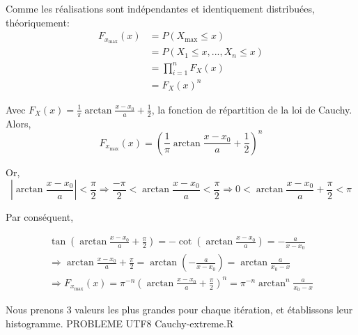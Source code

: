 \documentclass[12pt,a4paper,titlepage]{article}
\numberwithin{equation}{section}
\begin{document}
Comme les réalisations sont indépendantes et identiquement distribuées, théoriquement:
\begin{align*}
{F_{{x_{\max }}}}\left( x \right) & = P\left( {{X_{\max }} \le x} \right)\\
&  = P\left( {{X_1} \le x,...,{X_n} \le x} \right)\\
 & = \prod\limits_{i = 1}^n {{F_X}\left( x \right)} \\
 & = {F_X}{\left( x \right)^n}
\end{align*}

Avec ${F_X}\left( x \right) = \frac{1}{\pi }\arctan \frac{{x - {x_0}}}{a} + \frac{1}{2}$, la fonction de répartition de la loi de Cauchy. Alors, \[{F_{{x_{\max }}}}\left( x \right) = {\left( {\frac{1}{\pi }\arctan \frac{{x - {x_0}}}{a} + \frac{1}{2}} \right)^n}\]

Or, \[\left| {\arctan \frac{{x - {x_0}}}{a}} \right| < \frac{\pi }{2} \Rightarrow \frac{{ - \pi }}{2} < \arctan \frac{{x - {x_0}}}{a} < \frac{\pi }{2} \Rightarrow 0 < \arctan \frac{{x - {x_0}}}{a} + \frac{\pi }{2} < \pi \]

Par conséquent,

\[\begin{array}{l}
\tan \left( {\arctan \frac{{x - {x_0}}}{a} + \frac{\pi }{2}} \right) =  - \cot \left( {\arctan \frac{{x - {x_0}}}{a}} \right) =  - \frac{a}{{x - {x_0}}}\\
 \Rightarrow \arctan \frac{{x - {x_0}}}{a} + \frac{\pi }{2} = \arctan \left( { - \frac{a}{{x - {x_0}}}} \right) = \arctan \frac{a}{{{x_0} - x}}\\
 \Rightarrow {F_{{x_{\max }}}}\left( x \right) = {\pi ^{ - n}}{\left( {\arctan \frac{{x - {x_0}}}{a} + \frac{\pi }{2}} \right)^n} = {\pi ^{ - n}}{\arctan ^n}\frac{a}{{{x_0} - x}}
\end{array}\]
\clearpage

Nous prenons 3 valeurs les plus grandes pour chaque itération, et établissons leur histogramme.
PROBLEME UTF8 Cauchy-extreme.R
%
\end{document}
